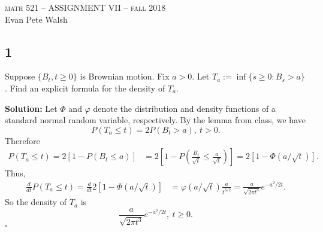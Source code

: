 \documentclass[12pt]{article}
\newcounter{ProofCounter}
\newenvironment{Solution}{\stepcounter{ProofCounter}\textbf{Solution:}}{\hfill$\square$}
\begin{document}
\thispagestyle{empty}
\begin{center}
  \Large \textsc{math 521 -- ASSIGNMENT VII -- fall 2018} \\ 
  \vspace{5mm}
  \large Evan Pete Walsh
\end{center}


\subsection*{1}
\begin{tcolorbox}
  Suppose $\{ B_t, t \geq 0\}$ is Brownian motion. Fix $a > 0$. Let $T_a := \inf\{ s \geq 0 : B_s > a\}$. Find an explicit formula for the density of $T_a$.
\end{tcolorbox}
\begin{Solution}
  Let $\Phi$ and $\varphi$ denote the distribution and density functions of a standard normal random variable, respectively. By the lemma from class, we have
  \begin{equation}
    P(T_a \leq t) = 2P(B_t > a), \ t > 0.
    \label{1.1}
  \end{equation}
  Therefore
  \begin{align*}
    P(T_a \leq t) = 2[1 - P(B_t \leq a)] & = 2 \left[ 1 - P \left( \frac{B_t}{\sqrt{t}} \leq \frac{a}{\sqrt{t}} \right) \right] = 2[1 - \Phi(a/\sqrt{t})].
  \end{align*}
  Thus,
  \begin{align*}
    \frac{d}{dt} P(T_a \leq t) = \frac{d}{dt} 2[1 - \Phi(a/\sqrt{t})] & = \varphi(a/\sqrt{t}) \frac{a}{t^{3/2}} = \frac{a}{\sqrt{2 \pi t^3}} e^{-a^2 / 2t}.
  \end{align*}
  So the density of $T_a$ is
  \[
    \frac{a}{\sqrt{2 \pi t^3}} e^{-a^2 / 2t}, \ t \geq 0.
  \]
\end{Solution}
\end{document}
